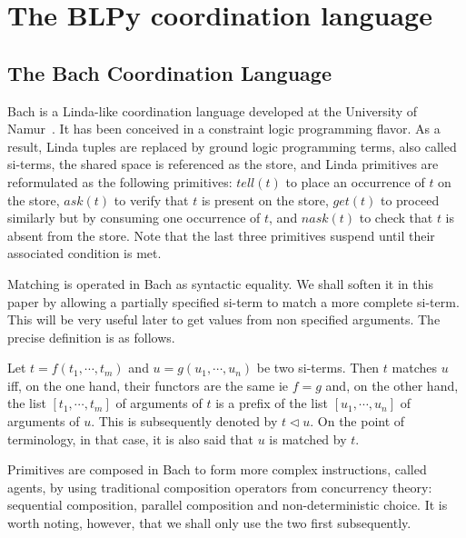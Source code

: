 \section{The BLPy coordination language}
\label{sect-BLPy}

\subsection{The Bach Coordination Language}

Bach is a Linda-like coordination language developed at the
University of Namur~\cite{jacquet2007coordinating}. It has been conceived in a
constraint logic programming flavor. As a result, Linda tuples are
replaced by ground logic programming terms, also called si-terms, the
shared space is referenced as the store, and Linda primitives are
reformulated as the following primitives: $\mathit{tell(t)}$ to place an
occurrence of $t$ on the store, $\mathit{ask(t)}$ to verify that $t$
is present on the store, $\mathit{get(t)}$ to proceed similarly but by
consuming one occurrence of $t$, and $\mathit{nask(t)}$ to check that
$t$ is absent from the store. Note that the last three primitives
suspend until their associated condition is met. 

Matching is operated in Bach as syntactic equality. We
shall soften it in this paper by allowing a partially specified
si-term to match a more complete si-term.  This will be very useful
later to get values from non specified arguments.  The precise
definition is as follows.

\begin{definition}
Let $t=f(t_1,\cdots,t_m)$ and $u=g(u_1, \cdots, u_n)$ be two
si-terms. Then $t$ matches $u$ iff, on the one hand, their functors
are the same ie $f=g$ and, on the other hand, the list
$[t_1,\cdots,t_m]$ of arguments of $t$ is a prefix of the list
$[u_1,\cdots,u_n]$ of arguments of $u$. This is subsequently denoted by
$t \triangleleft u$. On the point of terminology, in that case, it is also said that 
$u$ is matched by $t$.
\end{definition}

Primitives are composed in Bach to form more complex instructions,
called agents, by using traditional composition operators from
concurrency theory: sequential composition, parallel composition and
non-deterministic choice. It is worth noting, however, that we shall only use the two first subsequently.





